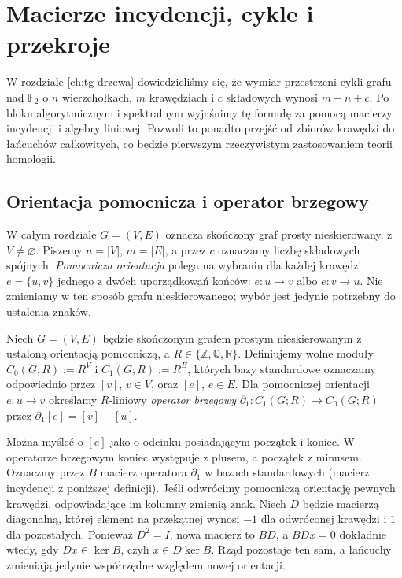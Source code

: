 \chapter{Macierze incydencji, cykle i przekroje}
\label{ch:tg-algebra}

W rozdziale \ref{ch:tg-drzewa} dowiedzieliśmy się, że wymiar przestrzeni
cykli grafu nad $\mathbb F_2$ o $n$ wierzchołkach, $m$ krawędziach i $c$ składowych wynosi
$m-n+c$. Po bloku algorytmicznym i spektralnym wyjaśnimy tę formułę
za pomocą macierzy incydencji i algebry liniowej.
Pozwoli to ponadto przejść od zbiorów krawędzi do łańcuchów całkowitych,
co będzie pierwszym rzeczywistym zastosowaniem teorii homologii.

\section{Orientacja pomocnicza i operator brzegowy}
\label{sec:tg-boundary}

W całym rozdziale $G=(V,E)$ oznacza skończony graf prosty
nieskierowany, z $V\ne\varnothing$. Piszemy $n=|V|$, $m=|E|$,
a przez $c$ oznaczamy liczbę składowych spójnych.
\emph{Pomocnicza orientacja} polega na wybraniu dla każdej krawędzi
$e=\{u,v\}$ jednego z dwóch uporządkowań końców: $e:u\to v$ albo
$e:v\to u$. Nie zmieniamy w ten sposób grafu nieskierowanego;
wybór jest jedynie potrzebny do ustalenia znaków.

\begin{definicja}
Niech $G=(V,E)$ będzie skończonym grafem prostym nieskierowanym
z ustaloną orientacją pomocniczą, a $R\in\{\mathbb Z,\mathbb Q,\mathbb R\}$.
Definiujemy wolne moduły
$C_0(G;R):=R^V$ i $C_1(G;R):=R^E$, których bazy standardowe
oznaczamy odpowiednio przez $[v]$, $v\in V$, oraz $[e]$, $e\in E$.
Dla pomocniczej orientacji $e:u\to v$ określamy $R$-liniowy
\emph{operator brzegowy} $\partial_1:C_1(G;R)\to C_0(G;R)$ przez
$\partial_1[e]=[v]-[u]$.
\end{definicja}

Można myśleć o $[e]$ jako o odcinku posiadającym początek i koniec.
W operatorze brzegowym koniec występuje z plusem, a początek z minusem.
Oznaczmy przez $B$ macierz operatora $\partial_1$ w bazach
standardowych (macierz incydencji z poniższej definicji).
Jeśli odwrócimy pomocniczą orientację pewnych krawędzi,
odpowiadające im kolumny zmienią znak. Niech $D$ będzie
macierzą diagonalną, której element na przekątnej wynosi $-1$ dla
odwróconej krawędzi i $1$ dla pozostałych. Ponieważ $D^2=I$,
nowa macierz to $BD$, a $BDx=0$ dokładnie wtedy, gdy
$Dx\in\ker B$, czyli $x\in D\ker B$.
Rząd pozostaje ten sam, a łańcuchy zmieniają jedynie
współrzędne względem nowej orientacji.

